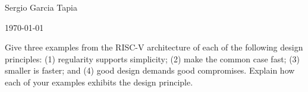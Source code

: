 \documentclass[12pt]{article}
\newenvironment{ex}[2][Exercise]{\begin{trivlist}
		\item[\hskip \labelsep {\bfseries #1}\hskip \labelsep {\bfseries #2.}]}{\end{trivlist}}
\begin{document}

\noindent Sergio Garcia Tapia \hfill

 \hfill

 \hfill 

\noindent\today

\begin{ex}{6.1}
	Give three examples from the RISC-V architecture of each of the following design principles:
	(1) regularity supports simplicity; (2) make the common case fast; (3) smaller is faster;
	and (4) good design demands good compromises. Explain how each of your examples exhibits
	the design principle.
\end{ex}
\end{document}

